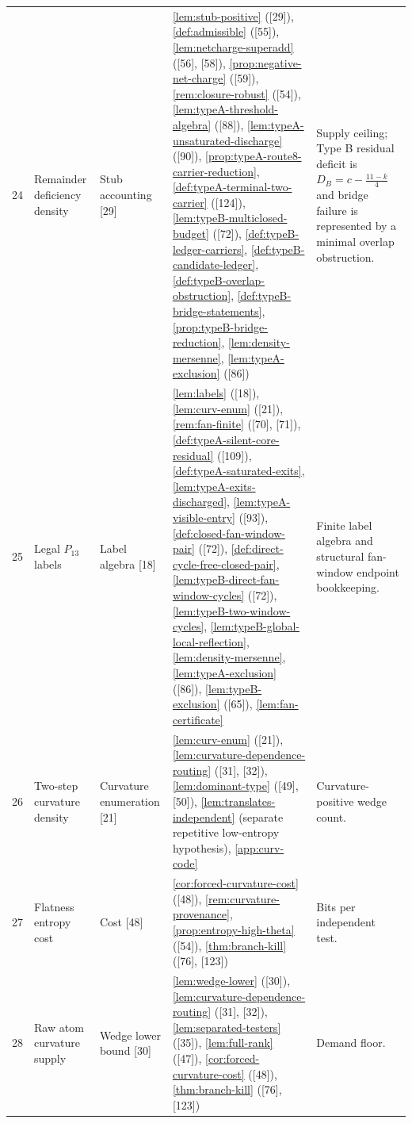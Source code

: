 \documentclass[11pt]{article}
\begin{document}
{\begin{longtable}{C{0.032\textwidth} L{0.145\textwidth} L{0.105\textwidth} L{0.50\textwidth} L{0.155\textwidth}}
24 & Remainder deficiency density & Stub accounting {[29]} & \cref{lem:stub-positive} ([29]), \cref{def:admissible} ([55]), \cref{lem:netcharge-superadd} ([56], [58]), \cref{prop:negative-net-charge} ([59]), \cref{rem:closure-robust} ([54]), \cref{lem:typeA-threshold-algebra} ([88]), \cref{lem:typeA-unsaturated-discharge} ([90]), \cref{prop:typeA-route8-carrier-reduction}, \cref{def:typeA-terminal-two-carrier} ([124]), \cref{lem:typeB-multiclosed-budget} ([72]), \cref{def:typeB-ledger-carriers}, \cref{def:typeB-candidate-ledger}, \cref{def:typeB-overlap-obstruction}, \cref{def:typeB-bridge-statements}, \cref{prop:typeB-bridge-reduction}, \cref{lem:density-mersenne}, \cref{lem:typeA-exclusion} ([86]) & Supply ceiling; Type B residual deficit is $D_B=c-\frac{11-k}{4}$ and bridge failure is represented by a minimal overlap obstruction. \\
25 & Legal $P_{13}$ labels & Label algebra {[18]} & \cref{lem:labels} ([18]), \cref{lem:curv-enum} ([21]), \cref{rem:fan-finite} ([70], [71]), \cref{def:typeA-silent-core-residual} ([109]), \cref{def:typeA-saturated-exits}, \cref{lem:typeA-exits-discharged}, \cref{lem:typeA-visible-entry} ([93]), \cref{def:closed-fan-window-pair} ([72]), \cref{def:direct-cycle-free-closed-pair}, \cref{lem:typeB-direct-fan-window-cycles} ([72]), \cref{lem:typeB-two-window-cycles}, \cref{lem:typeB-global-local-reflection}, \cref{lem:density-mersenne}, \cref{lem:typeA-exclusion} ([86]), \cref{lem:typeB-exclusion} ([65]), \cref{lem:fan-certificate} & Finite label algebra and structural fan-window endpoint bookkeeping. \\
26 & Two-step curvature density & Curvature enumeration {[21]} & \cref{lem:curv-enum} ([21]), \cref{lem:curvature-dependence-routing} ([31], [32]), \cref{lem:dominant-type} ([49], [50]), \cref{lem:translates-independent} (separate repetitive low-entropy hypothesis), \cref{app:curv-code} & Curvature-positive wedge count. \\
27 & Flatness entropy cost & Cost {[48]} & \cref{cor:forced-curvature-cost} ([48]), \cref{rem:curvature-provenance}, \cref{prop:entropy-high-theta} ([54]), \cref{thm:branch-kill} ([76], [123]) & Bits per independent test. \\
28 & Raw atom curvature supply & Wedge lower bound {[30]} & \cref{lem:wedge-lower} ([30]), \cref{lem:curvature-dependence-routing} ([31], [32]), \cref{lem:separated-testers} ([35]), \cref{lem:full-rank} ([47]), \cref{cor:forced-curvature-cost} ([48]), \cref{thm:branch-kill} ([76], [123]) & Demand floor. \\

\end{longtable}}
\end{document}
